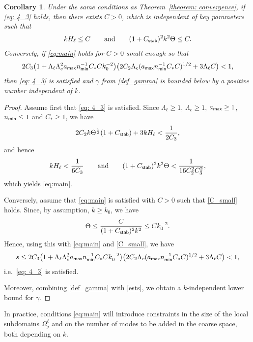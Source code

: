 \documentclass[numbers,webpdf,imaiai]{ima-authoring-template}%
\theoremstyle{thmstyletwo}%
\newtheorem{corollary}[theorem]{Corollary}
\numberwithin{equation}{section}
\newcommand{\Cstar}{C_{\ast}}
\numberwithin{equation}{section}
\newcommand{\Cstab}{C_{\textup{\textsf{stab}}}}
\newcommand{\amax}{a_{\textup{\textsf{max}}}}
\newcommand{\nmin}{n_{\textup{\textsf{min}}}}
\begin{document}
{\begin{corollary} \label{conditions_corollary}
Under the same conditions as Theorem~\ref{theorem: convergence}, if \eqref{eq: 4_3} holds, then there exists $C>0$, which is independent of key  parameters such that
\begin{equation}\label{eq:main}
	k H_\ell \le C \qquad\text{and}\qquad (1+\Cstab)^2 k^2  \Theta \le C.
\end{equation}
Conversely, if \eqref{eq:main} holds for $C>0$ small enough so that
\begin{equation}\label{C_small}
	2C_3\bigl(1+\Lambda_\ell \Lambda_c^2 \amax\nmin^{-1}\Cstar C {k_0^{-2}} \bigr)
	\bigl({2 C_2\Lambda_c(\amax \nmin^{-1} \Cstar C)^{1/2}} +3 \Lambda_\ell  C\bigr) < 1,
\end{equation}
then \eqref{eq: 4_3} is satisfied and $\gamma$ from \eqref{def_gamma} is bounded below by a positive
number independent of $k$.
\end{corollary}

\begin{proof}
Assume first that \eqref{eq: 4_3} is satisfied.  
Since  $\Lambda_\ell\ge1$,  $\Lambda_c\ge1$, $\amax\ge1$, $\nmin \le 1$ and $\Cstar \ge 1$, we have
\[
	2C_2 k \Theta^{\frac{1}{2}} (1+\Cstab) + 3k H_\ell < \frac{1}{2C_3},
\]
and hence
\[
	k H_\ell < \frac{1}{6C_3} \qquad\text{and}\qquad
	(1+\Cstab)^2 k^{2}\Theta < \frac{1}{16C_2^2C_3^2},
\]
which yields \eqref{eq:main}.  

Conversely, assume that \eqref{eq:main} is satisfied with $C>0$ such that \eqref{C_small} holds.
Since, by assumption, ${k\ge k_0}$, we have
\[
	\Theta \le \frac{C}{(1+\Cstab)^2 k^{2}} \le C{k_0^{-2}}.
\]
Hence, using this with  \eqref{eq:main} and \eqref{C_small}, we have
\begin{align}
	s \le 2C_3 \bigl(1 + \Lambda_\ell \Lambda_c^2 \amax \nmin^{-1} \Cstar C k_0^{-2}\bigr)
	\bigl(2 C_2\Lambda_c(\amax \nmin^{-1} \Cstar C)^{1/2}  +3\Lambda_\ell C\bigr) < 1,
\label{ests}
\end{align}
i.e.\ \eqref{eq: 4_3} is satisfied.
        
Moreover, combining \eqref{def_gamma} with \eqref{ests},  we obtain a $k$-independent lower bound for $\gamma$. 
\end{proof}

In practice, conditions \eqref{eq:main} will introduce constraints in the size of the
local subdomains $\Omega_j^\ell$ and on the number of modes to be added in the coarse space, both
depending on $k$.

}
\end{document}
